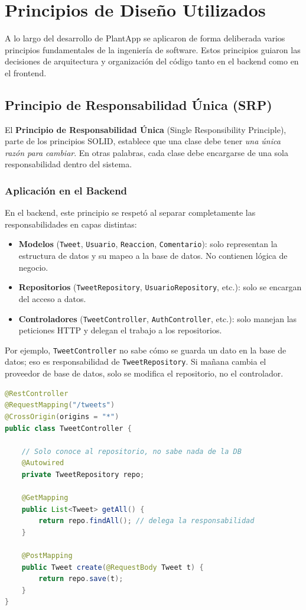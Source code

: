 \documentclass[12pt,a4paper]{article}
\begin{document}
\section{Principios de Diseño Utilizados}

A lo largo del desarrollo de PlantApp se aplicaron de forma deliberada varios principios fundamentales de la ingeniería de software. Estos principios guiaron las decisiones de arquitectura y organización del código tanto en el backend como en el frontend.

\subsection{Principio de Responsabilidad Única (SRP)}

El \textbf{Principio de Responsabilidad Única} (Single Responsibility Principle), parte de los principios SOLID, establece que una clase debe tener \textit{una única razón para cambiar}. En otras palabras, cada clase debe encargarse de una sola responsabilidad dentro del sistema.

\subsubsection{Aplicación en el Backend}

En el backend, este principio se respetó al separar completamente las responsabilidades en capas distintas:

\begin{itemize}[leftmargin=1.5cm]
  \item \textbf{Modelos} (\texttt{Tweet}, \texttt{Usuario}, \texttt{Reaccion}, \texttt{Comentario}): solo representan la estructura de datos y su mapeo a la base de datos. No contienen lógica de negocio.
  \item \textbf{Repositorios} (\texttt{TweetRepository}, \texttt{UsuarioRepository}, etc.): solo se encargan del acceso a datos.
  \item \textbf{Controladores} (\texttt{TweetController}, \texttt{AuthController}, etc.): solo manejan las peticiones HTTP y delegan el trabajo a los repositorios.
\end{itemize}

Por ejemplo, \texttt{TweetController} no sabe cómo se guarda un dato en la base de datos; eso es responsabilidad de \texttt{TweetRepository}. Si mañana cambia el proveedor de base de datos, solo se modifica el repositorio, no el controlador.

\begin{lstlisting}[style=javastyle, language=Java, caption=Separación de responsabilidades en TweetController]
@RestController
@RequestMapping("/tweets")
@CrossOrigin(origins = "*")
public class TweetController {

    // Solo conoce al repositorio, no sabe nada de la DB
    @Autowired
    private TweetRepository repo;

    @GetMapping
    public List<Tweet> getAll() {
        return repo.findAll(); // delega la responsabilidad
    }

    @PostMapping
    public Tweet create(@RequestBody Tweet t) {
        return repo.save(t);
    }
}
\end{lstlisting}
\end{document}
